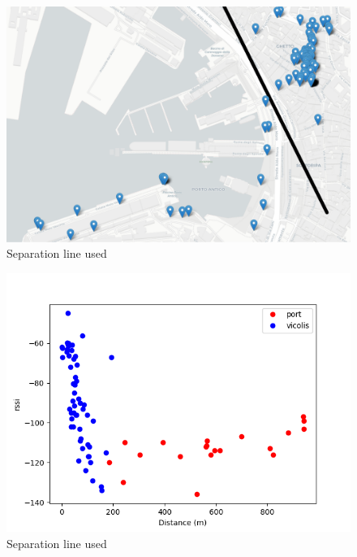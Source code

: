 \begin{figure}[htpb]
    \centering    
    \includegraphics[width=\linewidth]{dividedGenova.png}
    \caption{Separation line used}
    \label{chap:conc-div}
\end{figure}

\begin{figure}[htpb]
    \centering    
    \includegraphics[width=\linewidth]{rssidistancia.png}
    \caption{Separation line used}
    \label{chap:conc:dist}
\end{figure}

